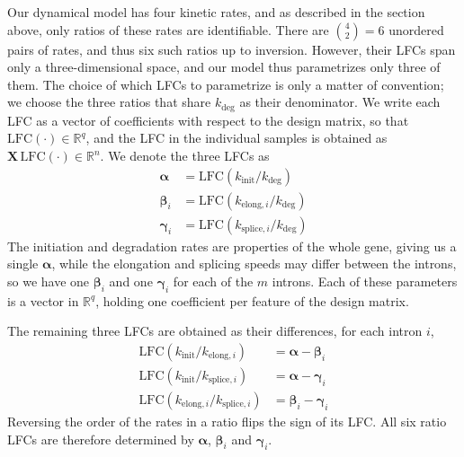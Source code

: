 \documentclass[11pt]{article}
\begin{document}
	Our dynamical model has four kinetic rates, and as described in the section  above, only ratios of these rates are identifiable. There are $\binom{4}{2} = 6$ unordered pairs of
	rates, and thus six such ratios up to inversion. However, their LFCs span only a three-dimensional space, and our model thus parametrizes only three of them. The choice of which LFCs to parametrize is only a matter of convention; we choose the three ratios that share $k_{\mathrm{deg}}$ as their denominator. We write each LFC as a vector of coefficients with respect to the design matrix, so that $\mathrm{LFC}(\cdot) \in \mathbb{R}^{q}$, and the LFC in the individual samples is obtained as $\boldsymbol{X} \, \mathrm{LFC}(\cdot) \in \mathbb{R}^{n}$. We denote the three LFCs as
	\begin{subequations}
		\begin{align}
			\boldsymbol{\alpha} &= \mathrm{LFC}(k_{\mathrm{init}} / k_{\mathrm{deg}}) \label{eq:alpha_def}\\
			\boldsymbol{\beta}_i &= \mathrm{LFC}(k_{\mathrm{elong},i} / k_{\mathrm{deg}}) \label{eq:beta_def}\\
			\boldsymbol{\gamma}_i &= \mathrm{LFC}(k_{\mathrm{splice},i} / k_{\mathrm{deg}}) \label{eq:gamma_def}
		\end{align}
	\end{subequations}
	The initiation and degradation rates are properties of the whole gene, giving us a single $\boldsymbol{\alpha}$, while the elongation and splicing speeds may differ between the introns, so we have one $\boldsymbol{\beta}_i$ and one $\boldsymbol{\gamma}_i$ for each of the $m$ introns. Each of these parameters is a vector in $\mathbb{R}^{q}$, holding one coefficient per feature of the design matrix.

	The remaining three LFCs are obtained as their differences, for each intron $i$,
	\begin{subequations}
		\begin{align}
			\mathrm{LFC}(k_{\mathrm{init}} / k_{\mathrm{elong},i}) &= \boldsymbol{\alpha} - \boldsymbol{\beta}_i \label{eq:lfc_init_over_elong}\\
			\mathrm{LFC}(k_{\mathrm{init}} / k_{\mathrm{splice},i}) &= \boldsymbol{\alpha} - \boldsymbol{\gamma}_i \label{eq:lfc_init_over_splice}\\
			\mathrm{LFC}(k_{\mathrm{elong},i} / k_{\mathrm{splice},i}) &= \boldsymbol{\beta}_i - \boldsymbol{\gamma}_i \label{eq:lfc_elong_over_splice}
		\end{align}
	\end{subequations}
	Reversing the order of the rates in a ratio flips the sign of its LFC. All six ratio LFCs are therefore determined by $\boldsymbol{\alpha}$, $\boldsymbol{\beta}_i$ and $\boldsymbol{\gamma}_i$.
\end{document}
